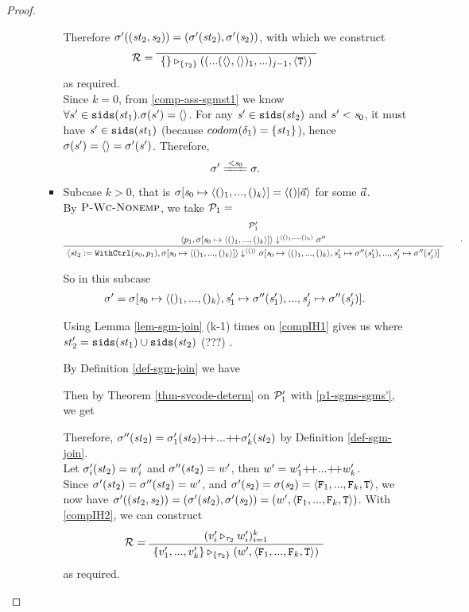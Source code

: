 \begin{proof}
\begin{itemize}
\begin{enumerate}[(i)]
\begin{itemize}
	Therefore $\sigma'((\mathit{st}_2,\mathit{s}_2)) = (\sigma'(\mathit{st}_2), \sigma'(\mathit{s}_2))$, with which we construct 
	$$\MR = 
	\PT{\Axiom{\ValRep{\{\}}{\tseq{\tau_2}}{((...(\emptyv,\emptyv)_1,...)_{j-1},\oT)}}}$$ 
	as required.\\
    
    Since $k=0$, from \eqref{comp-ass-sgmst1} we know $\forall s' \in \mathtt{sids}(\mathit{st}_1). \sigma(s') = \langle \rangle$. 
    For any $\mathit{s}' \in \mathtt{sids}(\mathit{st}_2)$ and $s' < \mathit{s}_0$, it must have $\mathit{s}' \in \mathtt{sids}(\mathit{st}_1)$ 
    (because $codom(\delta_1) = \{\mathit{st}_1\}$), hence $\sigma(\mathit{s}') = \langle \rangle = \sigma'(\mathit{s}')$. 
    Therefore, $$\sgm' \ConEq{\s_0} \sgm.$$
    

\def\sgmp-nonempty{\sgm[\s_0 \|-> \kunit, \s_1' \|-> \sgm''(\s'_1),...,
	\s'_j \|-> \sgm''(\s'_j)]}  

	\item \label{subcase-2} 
	Subcase $k > 0$, that is $\sgmsz = \< ()|\a \'>$ for some $\vec a$. \\
	By $\textsc{P-Wc-Nonemp}$, we take $\mathcal{P}_1 = $
	$$\PT{
		\UCN{\MP_1'}{\seval{p_1}{\sgmsz}{\kunit}{\sgm''}}
		\UC{\seval{\withctrl {s_0} {p_1} {\st_2} } 
				  {\sgmsz} 
				  {\vunit} 
				  {\sgmp-nonempty}}
	}.$$
	
	So in this subcase $$\sgm' = \sgmp-nonempty.$$
	
	Using Lemma \ref{lem-sgm-join} (k-1) times on \eqref{compIH1} gives us
	where $\mathit{st}_2' = \mathtt{sids}(\mathit{st}_1) \cup \mathtt{sids}(\mathit{st}_2)$ (???) . 
	
	By Definition \ref{def-sgm-join} we have
	
	Then by Theorem \ref{thm-svcode-determ} on $\mathcal{P}_1'$ with \eqref{p1-sgms-sgms'}, we get
	
	Therefore, $\sgm''(\st_2) = \sgm'_1(\st_2) {\++} ... {\++} \sgm'_k(\st_2)$ by Definition \ref{def-sgm-join}.\\
	Let $\sigma'_i(\mathit{st}_2) = w'_i$ and  $\sigma''(\mathit{st}_2) = w'$, then
	$w' = w'_1 {\++} ... {\++} w'_k$. \\
	
	Since $\sigma'(\mathit{st}_2) = \sigma''(\mathit{st}_2) = w'$, and $\sgm'(\s_2) = \sgm(\s_2) = \stwo$,
	we now have $\sgm'((\st_2,\s_2)) = (\sgm'(\st_2),\sgm'(\s_2)) = (w',\stwo)$. 
	With \eqref{compIH2}, we can construct
	$$\MR = 
	\PT{
		\AC{(\ValRep{v'_i}{\tau_2}{w'_i})^k_{i=1}}
		\UC{\ValRep{\Seqk{v'}}{\tseq{\tau_2}}{(w',\stwo)}}
	}$$ as required. \\


\end{itemize}
\end{enumerate}
\end{itemize}
\end{proof}
